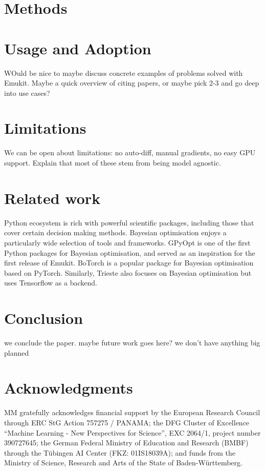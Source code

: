 \section{Methods}


\section{Usage and Adoption}
WOuld be nice to maybe discuss concrete examples of problems solved with Emukit. Maybe a quick overview of citing papers, or maybe pick 2-3 and go deep into use cases? 

\section{Limitations}
We can be open about limitations: no auto-diff, manual gradients, no easy GPU support. Explain that most of these stem from being model agnostic.

\section{Related work}
Python ecosystem is rich with powerful scientific packages, including those that cover certain decision making methods. Bayesian optimisation enjoys a particularly wide selection of tools and frameworks. GPyOpt \cite{gpyopt2016} is one of the first Python packages for Bayesian optimisation, and served as an inspiration for the first release of Emukit. BoTorch \cite{balandat2020botorch} is a popular package for Bayesian optimisation based on PyTorch. Similarly, Trieste \cite{picheny2023trieste} also focuses on Bayesian optimisation but uses Tensorflow as a backend. 



\section{Conclusion}
we conclude the paper. maybe future work goes here? we don't have anything big planned

\section{Acknowledgments}
MM gratefully acknowledges financial support by the European Research Council through ERC StG Action 757275 / PANAMA; the DFG Cluster of Excellence “Machine Learning - New Perspectives for Science”, EXC 2064/1, project number 390727645; the German Federal Ministry of Education and Research (BMBF) through the T\"{u}bingen AI Center (FKZ: 01IS18039A); and funds from the Ministry of Science, Research and Arts of the State of Baden-W\"{u}rttemberg.
